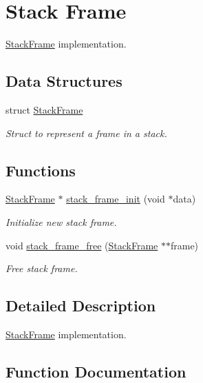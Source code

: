 \hypertarget{group__StackFrame}{}\section{Stack Frame}
\label{group__StackFrame}


\hyperlink{structStackFrame}{Stack\+Frame} implementation.  


\subsection*{Data Structures}
\begin{DoxyCompactItemize}
\item 
struct \hyperlink{structStackFrame}{Stack\+Frame}
\begin{DoxyCompactList}\small\item\em Struct to represent a frame in a stack. \end{DoxyCompactList}\end{DoxyCompactItemize}
\subsection*{Functions}
\begin{DoxyCompactItemize}
\item 
\hyperlink{structStackFrame}{Stack\+Frame} $\ast$ \hyperlink{group__StackFrame_ga2ecf08ec1545d0db09d8558460770c53}{stack\+\_\+frame\+\_\+init} (void $\ast$data)
\begin{DoxyCompactList}\small\item\em Initialize new stack frame. \end{DoxyCompactList}\item 
void \hyperlink{group__StackFrame_gacf9978dee50e18700dbd17c5346ff0ce}{stack\+\_\+frame\+\_\+free} (\hyperlink{structStackFrame}{Stack\+Frame} $\ast$$\ast$frame)
\begin{DoxyCompactList}\small\item\em Free stack frame. \end{DoxyCompactList}\end{DoxyCompactItemize}


\subsection{Detailed Description}
\hyperlink{structStackFrame}{Stack\+Frame} implementation. 



\subsection{Function Documentation}
\mbox{\label{group__StackFrame_gacf9978dee50e18700dbd17c5346ff0ce}} 
